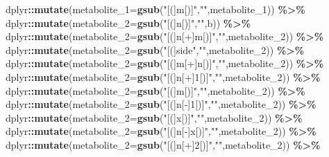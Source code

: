 \documentclass[
]{book}
\newenvironment{Shaded}{\begin{snugshade}}{\end{snugshade}}
\newcommand{\AttributeTok}[1]{\textcolor[rgb]{0.13,0.29,0.53}{#1}}
\newcommand{\FunctionTok}[1]{\textcolor[rgb]{0.13,0.29,0.53}{\textbf{#1}}}
\newcommand{\NormalTok}[1]{#1}
\newcommand{\SpecialCharTok}[1]{\textcolor[rgb]{0.81,0.36,0.00}{\textbf{#1}}}
\newcommand{\StringTok}[1]{\textcolor[rgb]{0.31,0.60,0.02}{#1}}
\begin{document}
\begin{Shaded}
\begin{Highlighting}[]
\NormalTok{  dplyr}\SpecialCharTok{::}\FunctionTok{mutate}\NormalTok{(}\AttributeTok{metabolite\_1=}\FunctionTok{gsub}\NormalTok{(}\StringTok{"[(]m[)]"}\NormalTok{,}\StringTok{""}\NormalTok{,metabolite\_1)) }\SpecialCharTok{\%\textgreater{}\%}
\NormalTok{  dplyr}\SpecialCharTok{::}\FunctionTok{mutate}\NormalTok{(}\AttributeTok{metabolite\_2=}\FunctionTok{gsub}\NormalTok{(}\StringTok{"[(]n[)]"}\NormalTok{,}\StringTok{""}\NormalTok{,b)) }\SpecialCharTok{\%\textgreater{}\%}
\NormalTok{  dplyr}\SpecialCharTok{::}\FunctionTok{mutate}\NormalTok{(}\AttributeTok{metabolite\_2=}\FunctionTok{gsub}\NormalTok{(}\StringTok{"[(]n[+]m[)]"}\NormalTok{,}\StringTok{""}\NormalTok{,metabolite\_2)) }\SpecialCharTok{\%\textgreater{}\%}
\NormalTok{  dplyr}\SpecialCharTok{::}\FunctionTok{mutate}\NormalTok{(}\AttributeTok{metabolite\_2=}\FunctionTok{gsub}\NormalTok{(}\StringTok{"[(]side"}\NormalTok{,}\StringTok{""}\NormalTok{,metabolite\_2)) }\SpecialCharTok{\%\textgreater{}\%}
\NormalTok{  dplyr}\SpecialCharTok{::}\FunctionTok{mutate}\NormalTok{(}\AttributeTok{metabolite\_2=}\FunctionTok{gsub}\NormalTok{(}\StringTok{"[(]m[+]n[)]"}\NormalTok{,}\StringTok{""}\NormalTok{,metabolite\_2)) }\SpecialCharTok{\%\textgreater{}\%}
\NormalTok{  dplyr}\SpecialCharTok{::}\FunctionTok{mutate}\NormalTok{(}\AttributeTok{metabolite\_2=}\FunctionTok{gsub}\NormalTok{(}\StringTok{"[(]n[+]1[)]"}\NormalTok{,}\StringTok{""}\NormalTok{,metabolite\_2)) }\SpecialCharTok{\%\textgreater{}\%}
\NormalTok{  dplyr}\SpecialCharTok{::}\FunctionTok{mutate}\NormalTok{(}\AttributeTok{metabolite\_2=}\FunctionTok{gsub}\NormalTok{(}\StringTok{"[(]m[)]"}\NormalTok{,}\StringTok{""}\NormalTok{,metabolite\_2)) }\SpecialCharTok{\%\textgreater{}\%}
\NormalTok{  dplyr}\SpecialCharTok{::}\FunctionTok{mutate}\NormalTok{(}\AttributeTok{metabolite\_2=}\FunctionTok{gsub}\NormalTok{(}\StringTok{"[(]n[{-}]1[)]"}\NormalTok{,}\StringTok{""}\NormalTok{,metabolite\_2)) }\SpecialCharTok{\%\textgreater{}\%}
\NormalTok{  dplyr}\SpecialCharTok{::}\FunctionTok{mutate}\NormalTok{(}\AttributeTok{metabolite\_2=}\FunctionTok{gsub}\NormalTok{(}\StringTok{"[(]x[)]"}\NormalTok{,}\StringTok{""}\NormalTok{,metabolite\_2)) }\SpecialCharTok{\%\textgreater{}\%}
\NormalTok{  dplyr}\SpecialCharTok{::}\FunctionTok{mutate}\NormalTok{(}\AttributeTok{metabolite\_2=}\FunctionTok{gsub}\NormalTok{(}\StringTok{"[(]n[{-}]x[)]"}\NormalTok{,}\StringTok{""}\NormalTok{,metabolite\_2)) }\SpecialCharTok{\%\textgreater{}\%}
\NormalTok{  dplyr}\SpecialCharTok{::}\FunctionTok{mutate}\NormalTok{(}\AttributeTok{metabolite\_2=}\FunctionTok{gsub}\NormalTok{(}\StringTok{"[(]n[+]2[)]"}\NormalTok{,}\StringTok{""}\NormalTok{,metabolite\_2)) }\SpecialCharTok{\%\textgreater{}\%}

\end{Highlighting}
\end{Shaded}
\end{document}
